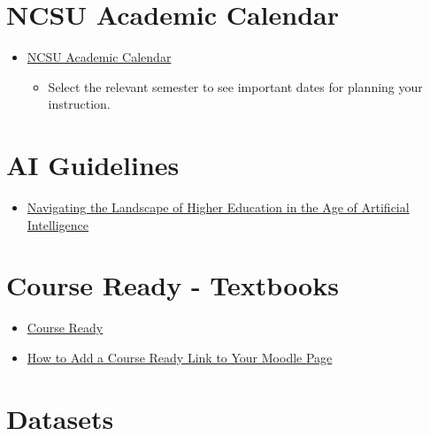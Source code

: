 \documentclass[
  letterpaper,
  DIV=11,
  numbers=noendperiod]{scrreprt}
\providecommand{\tightlist}{%
  \setlength{\itemsep}{0pt}\setlength{\parskip}{0pt}}
\begin{document}
\section{NCSU Academic Calendar}\label{ncsu-academic-calendar}

\begin{itemize}
\tightlist
\item
  \href{https://studentservices.ncsu.edu/calendars/academic/}{NCSU
  Academic Calendar}

  \begin{itemize}
  \tightlist
  \item
    Select the relevant semester to see important dates for planning
    your instruction.
  \end{itemize}
\end{itemize}

\section{AI Guidelines}\label{ai-guidelines}

\begin{itemize}
\tightlist
\item
  \href{https://provost.ncsu.edu/ofe/navigating-the-landscape-of-higher-education-in-the-age-of-artificial-intelligence/}{Navigating
  the Landscape of Higher Education in the Age of Artificial
  Intelligence}
\end{itemize}

\section{Course Ready - Textbooks}\label{course-ready---textbooks}

\begin{itemize}
\tightlist
\item
  \href{https://shop.ncsu.edu/course-ready}{Course Ready}
\item
  \href{https://ncsu.service-now.com/delta?id=kb_article_ml&sysparm_article=KB0022447}{How
  to Add a Course Ready Link to Your Moodle Page}
\end{itemize}

\section{Datasets}\label{datasets}
\end{document}
